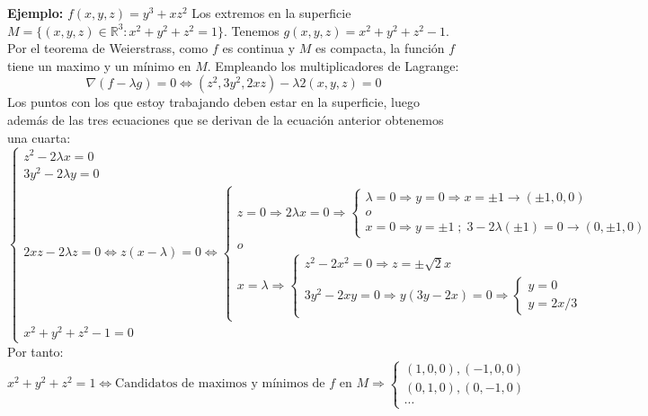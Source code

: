\documentclass[11pt]{article}
\newcommand{\R}{\mathbb{R}}
\theoremstyle{plain}
\begin{document}
    \textbf{Ejemplo:} $f(x,y,z) = y^3 + xz^2$ Los extremos en la superficie $M = \{(x,y,z)\in \R^3 : x^2 + y^2 + z^2 = 1\}$. Tenemos $g(x,y,z) = x^2 + y^2 + z^2 - 1$. Por el teorema de Weierstrass, como $f$ es continua y $M$ es compacta, la función $f$ tiene un maximo y un mínimo en $M$. Empleando los multiplicadores de Lagrange:
    \[\nabla(f- \lambda g)=0 \Leftrightarrow (z^2, 3y^2,2xz)-\lambda2(x,y,z) = 0 \]
    Los puntos con los que estoy trabajando deben estar en la superficie, luego además de las tres ecuaciones que se derivan de la ecuación anterior obtenemos una cuarta:
    \begin{equation}
        \begin{cases}
            z^2 - 2\lambda x = 0\\
            3y^2 - 2\lambda y = 0\\
            2xz - 2 \lambda z = 0 \Leftrightarrow z(x-\lambda) = 0 \Leftrightarrow
            \begin{cases}
                z = 0 \Rightarrow 2\lambda x = 0 \Rightarrow
                \begin{cases}
                    \lambda = 0 \Rightarrow y = 0 \Rightarrow x = \pm 1 \rightarrow (\pm 1, 0, 0)\\
                    o\\
                    x = 0  \Rightarrow y = \pm 1 \; ; \; 3 - 2\lambda (\pm 1) = 0 \rightarrow (0, \pm 1, 0)
                \end{cases}\\
                o \\
                x = \lambda \Rightarrow
                \begin{cases}
                    z^2 - 2x^2 = 0 \Rightarrow z = \pm \sqrt{2} x\\
                    3y^2 -2xy = 0 \Rightarrow y(3y -2x) = 0 \Rightarrow
                    \begin{cases}    
                        y = 0\\
                        y = 2x/3
                    \end{cases}  
                \end{cases}
            \end{cases}\\
            x^2 + y^2 + z^2 -1 = 0
        \end{cases}
    \end{equation}
    Por tanto:
    \begin{equation}
        x^2 + y^2 + z^2 = 1 \Leftrightarrow \text{Candidatos de maximos y mínimos de $f$ en $M$} \Rightarrow
        \begin{cases}
            (1,0,0), (-1,0,0)\\
            (0,1,0), (0,-1,0)\\
            \cdots
        \end{cases}
    \end{equation}
\end{document}
